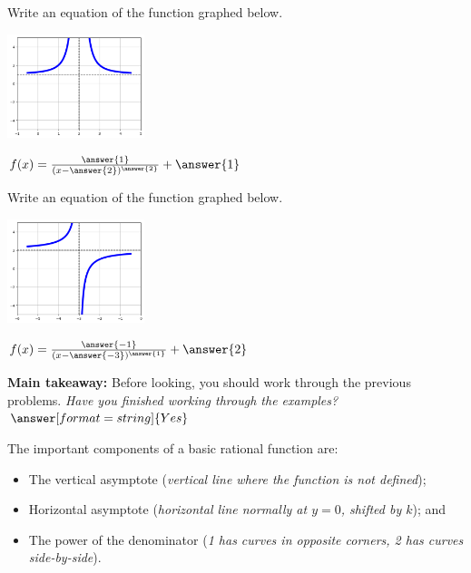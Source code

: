 \documentclass{ximera}
\begin{document}
\begin{question}
Write an equation of the function graphed below. 

	\begin{center}
	    \includegraphics[width = 0.3\textwidth]{graphRationalQ5.png}
	\end{center}

$f(x) = \frac{\answer{1}}{(x - \answer{2})^{\answer{2}}} + \answer{1}$
\end{question}

\begin{question}
Write an equation of the function graphed below. 

	\begin{center}
	    \includegraphics[width = 0.3\textwidth]{graphRationalQ6.png}
	\end{center}

$f(x) = \frac{\answer{-1}}{(x - \answer{-3})^{\answer{1}}} + \answer{2}$
\end{question}

\begin{question}
\textbf{Main takeaway:} Before looking, you should work through the previous problems. \textit{Have you finished working through the examples?} $\answer[format=string]{Yes}$
\begin{feedback}[correct]
The important components of a basic rational function are:
\begin{itemize}
	\item The vertical asymptote (\textit{vertical line where the function is not defined});
	\item Horizontal asymptote (\textit{horizontal line normally at $y=0$, shifted by $k$}); and
	\item The power of the denominator (\textit{1 has curves in opposite corners, 2 has curves side-by-side}).
\end{itemize}
\end{feedback}
\end{question}
\end{document}
